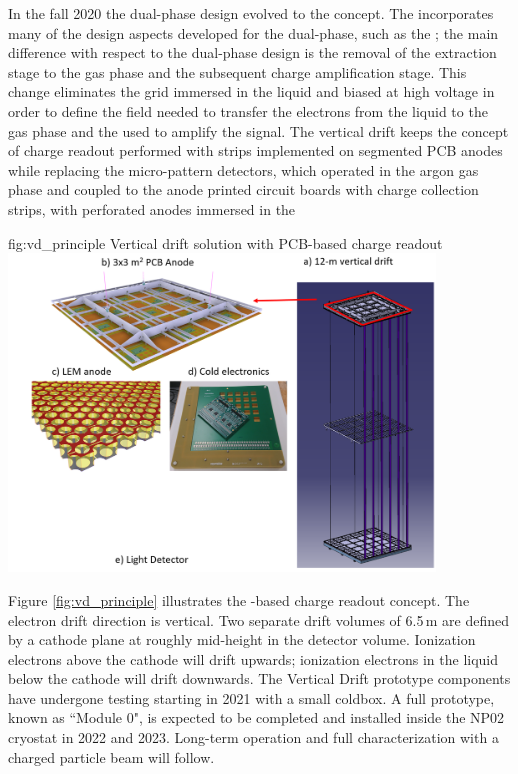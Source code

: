 \documentclass[../main-v1.tex]{subfiles}
\begin{document}
In the fall 2020 the dual-phase design evolved to the  concept. The  incorporates many of the design aspects developed for the dual-phase, such as the ;   the  main  difference  with  respect  to  the  dual-phase  design  is   the  removal  of  the  extraction  stage  to  the  gas  phase  and  the  subsequent  charge  amplification  stage.   This  change eliminates the grid immersed in the liquid and biased at high voltage in order to define the field needed to transfer the electrons from the liquid to the gas phase and the  used to amplify the signal. The vertical drift  keeps the concept of charge readout performed with strips implemented on segmented PCB anodes while replacing
 the  micro-pattern detectors, which operated in the argon gas phase and coupled to the anode printed circuit boards with charge collection strips, with perforated anodes immersed in the 
 

\begin{dunefigure}
{fig:vd_principle}
{Vertical drift solution with PCB-based charge readout}
\includegraphics[width=0.85\textwidth]{graphics/IntroFigures/Fig_13_VD_solution.png}
\end{dunefigure}

 Figure \ref{fig:vd_principle} illustrates the -based charge readout concept. The electron drift direction is vertical.
Two separate drift volumes of 6.5\,m are defined by a cathode plane at roughly mid-height in the
detector volume. Ionization electrons above the cathode will drift upwards; ionization electrons in the liquid below the cathode will drift downwards.
The Vertical Drift  prototype components have undergone testing starting in 2021 with a small coldbox.  A full prototype, known as ``Module 0", is expected to be completed and  installed 
 inside the NP02 cryostat in 2022 and 2023. Long-term operation and full characterization with a charged particle beam will follow. 
\end{document}
